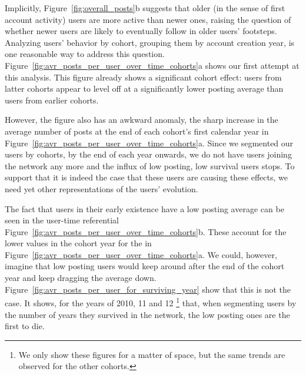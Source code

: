 

Implicitly, Figure~\ref{fig:overall_posts}b suggests that older (in the sense of first account activity) users are more active than newer ones, raising the question of whether newer users
are likely to eventually follow in older users' footsteps.  Analyzing users' behavior by cohort, grouping them by account creation year, is one reasonable way to address this question.  Figure~\ref{fig:avr_posts_per_user_over_time_cohorts}a shows our first attempt at this analysis.  This figure already shows a significant cohort effect: users from latter cohorts appear to level off at a significantly lower posting average than users from earlier cohorts.  

However, the figure also has an awkward anomaly, the sharp increase in the average number of posts at the end of each cohort's first calendar year in Figure~\ref{fig:avr_posts_per_user_over_time_cohorts}a.  Since we segmented our users by cohorts, by the end of each year onwards, we do not have users joining the network any more and the influx of low posting, low survival users stops. To support that it is indeed the case that these users are causing these effects, we need yet other representations of the users' evolution.

The fact that users in their early existence have a low posting average can be seen in the user-time referential Figure~\ref{fig:avr_posts_per_user_over_time_cohorts}b. These account for the lower values in the cohort year for the in Figure~\ref{fig:avr_posts_per_user_over_time_cohorts}a. We could, however, imagine that low posting users would keep around after the end of the cohort year and keep dragging the average down. Figure~\ref{fig:avr_posts_per_user_for_surviving_year} show that this is not the case. It shows, for the years of 2010, 11 and 12 \footnote{We only show these figures for a matter of space, but the same trends are observed for the other cohorts.} that, when segmenting users by the number of years they survived in the network, the low posting ones are the first to die.



